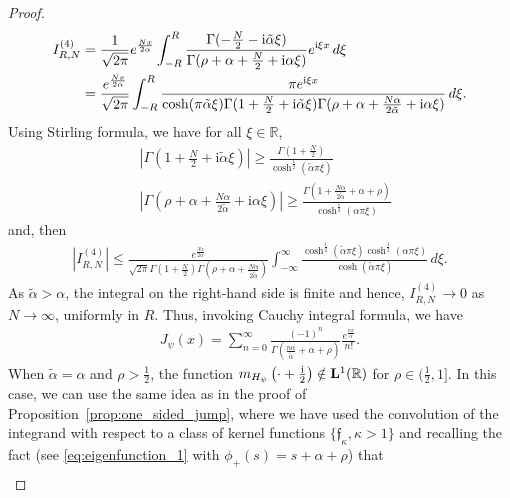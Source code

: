 \documentclass[12pt]{amsart}
\numberwithin{equation}{section}
\newcommand{\bb}{\mathbb}
\renewcommand{\ge}{\geqslant}
\renewcommand{\le}{\leqslant}
\newcommand{\mf}{\mathfrak}
\newcommand{\bmrm}[2][2]{\mathbf{#2}^{#1}}
\newcommand{\Jpo}{J_{\psi}}
\newcommand{\Hpsi}{H_\psi}
\theoremstyle{definition}
\theoremstyle{assump}
\theoremstyle{remark}
\begin{document}
{\begin{proof}
\begin{align}
I^{(4)}_{R,N}&=\frac{1}{\sqrt{2\pi}}e^{\frac{Nx}{2\alpha}}\int_{-R}^R \frac{\Gamma(-\frac{N}{2}-{\rm{i}}\tilde{\alpha}\xi)}{\Gamma(\rho+\alpha+\frac{N}{2}+{\rm{i}}\alpha\xi)}e^{{\rm{i}}\xi x}\,d\xi \nonumber \\
&=\frac{e^{\frac{Nx}{2\alpha}}}{\sqrt{2\pi}}\int_{-R}^R\frac{\pi e^{{\rm{i}}\xi x}}{\cosh(\pi\tilde{\alpha}\xi)\Gamma(1+\frac{N}{2}+\mathrm{i}\tilde{\alpha}\xi)\Gamma(\rho+\alpha+\frac{N\alpha}{2\tilde{\alpha}}+{\rm{i}}\alpha\xi)}\,d\xi. \nonumber
\end{align}
Using Stirling formula, we have for all $\xi\in\bb{R}$,
\begin{equation}
\begin{aligned}
&\left|\Gamma\left(1+\frac{N}{2}+\mathrm{i}\tilde{\alpha}\xi\right)\right|\ge\frac{\Gamma(1+\frac{N}{2})}{\cosh^{\frac{1}{2}}(\tilde{\alpha}\pi\xi)} \nonumber \\
&\left|\Gamma\left(\rho+\alpha+\frac{N\alpha}{2\tilde{\alpha}}+\mathrm{i}\alpha\xi\right)\right|\ge\frac{\Gamma(1+\frac{N\alpha}{2\tilde{\alpha}}+\alpha+\rho)}{\cosh^{\frac{1}{2}}(\alpha\pi\xi)} \nonumber
\end{aligned}
\end{equation}
and, then
\begin{align*}
|I^{(4)}_{R,N}|\le \frac{e^{\frac{Nx}{2\alpha}}}{\sqrt{2\pi}\Gamma(1+\frac{N}{2})\Gamma(\rho+\alpha+\frac{N\alpha}{2\tilde{\alpha}})}\int_{-\infty}^\infty \frac{\cosh^{\frac{1}{2}}(\tilde{\alpha}\pi\xi)\cosh^{\frac{1}{2}}(\alpha\pi\xi)}{\cosh(\tilde{\alpha}\pi\xi)}\,d\xi.
\end{align*}
As $\tilde{\alpha}>\alpha$, the integral on the right-hand side is finite and hence, $I^{(4)}_{R,N}\to 0$ as $N\to\infty$, uniformly in $R$. Thus, invoking Cauchy integral formula, we have
\begin{align*}
\Jpo(x)=\sum_{n=0}^\infty\frac{(-1)^n}{\Gamma(\frac{n\alpha}{\tilde{\alpha}}+\alpha+\rho)}\frac{e^{\frac{nx}{\alpha}}}{n!}.
\end{align*}
When $\tilde{\alpha}=\alpha$ and $\rho>\frac{1}{2}$, the function $m_{\Hpsi}\left(\cdot+\frac{{\rm{i}}}{2}   \right)\notin\bmrm[1]{L}(\bb{R})$ for $\rho\in (\frac{1}{2},1]$. In this case, we can use the same idea as in the proof of Proposition~\ref{prop:one_sided_jump}, where we have used the convolution of the integrand with respect to a class of kernel functions $\{\mf{f}_\kappa, \kappa>1\}$ and recalling the  fact (see \eqref{eq:eigenfunction_1} with $\phi_+(s)=s+\alpha+\rho$) that
\begin{align*}

\end{align*}
\end{proof}}
\end{document}
